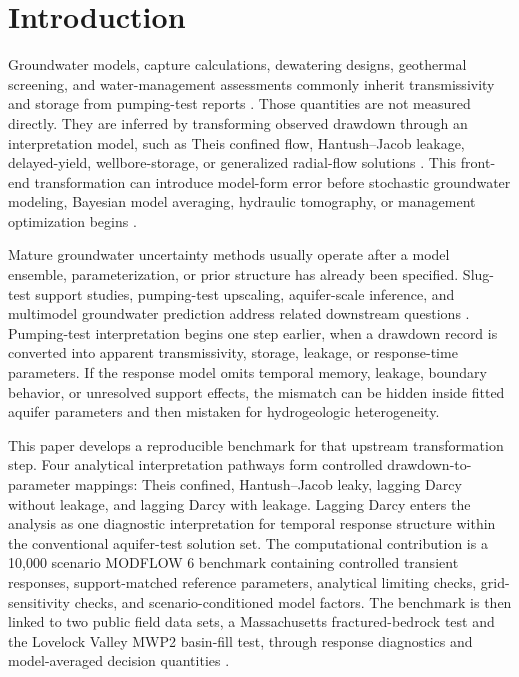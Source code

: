 \documentclass[a4paper,fleqn]{cas-sc}
\begin{document}
\maketitle
\doublespacing
\linenumbers

\section{Introduction}

Groundwater models, capture calculations, dewatering designs, geothermal screening, and water-management assessments commonly inherit transmissivity and storage from pumping-test reports \citep{freeze_cherry1979,bear1979,anderson2015}. Those quantities are not measured directly. They are inferred by transforming observed drawdown through an interpretation model, such as Theis confined flow, Hantush--Jacob leakage, delayed-yield, wellbore-storage, or generalized radial-flow solutions \citep{theis1935,cooper_jacob1946,hantush_jacob1955,boulton1954,papadopulos_cooper1967,neuman1975,barker1988}. This front-end transformation can introduce model-form error before stochastic groundwater modeling, Bayesian model averaging, hydraulic tomography, or management optimization begins \citep{rojas2008,tsai2010,tsai_elshall2013,doherty2015}.

Mature groundwater uncertainty methods usually operate after a model ensemble, parameterization, or prior structure has already been specified. Slug-test support studies, pumping-test upscaling, aquifer-scale inference, and multimodel groundwater prediction address related downstream questions \citep{beckie_harvey2002,manewell2022,manewell2024,naderi_gupta2023,li_tsai2009}. Pumping-test interpretation begins one step earlier, when a drawdown record is converted into apparent transmissivity, storage, leakage, or response-time parameters. If the response model omits temporal memory, leakage, boundary behavior, or unresolved support effects, the mismatch can be hidden inside fitted aquifer parameters and then mistaken for hydrogeologic heterogeneity.

This paper develops a reproducible benchmark for that upstream transformation step. Four analytical interpretation pathways form controlled drawdown-to-parameter mappings: Theis confined, Hantush--Jacob leaky, lagging Darcy without leakage, and lagging Darcy with leakage. Lagging Darcy enters the analysis as one diagnostic interpretation for temporal response structure within the conventional aquifer-test solution set. The computational contribution is a 10,000 scenario MODFLOW 6 benchmark containing controlled transient responses, support-matched reference parameters, analytical limiting checks, grid-sensitivity checks, and scenario-conditioned model factors. The benchmark is then linked to two public field data sets, a Massachusetts fractured-bedrock test and the Lovelock Valley MWP2 basin-fill test, through response diagnostics and model-averaged decision quantities \citep{cho2004pumping,cho2008characterization,nadler2020report,nadler2020data}.
\end{document}
